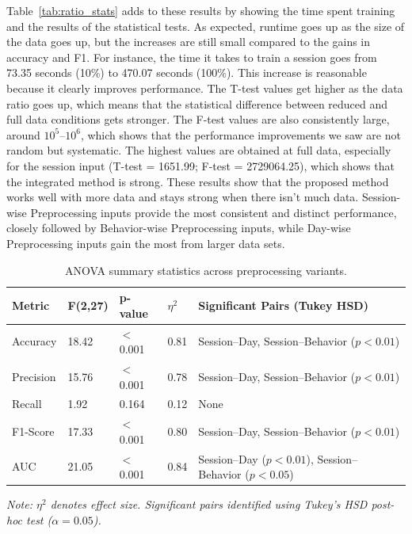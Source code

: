 Table~\ref{tab:ratio_stats} adds to these results by showing the time spent training and the results of the statistical tests. As expected, runtime goes up as the size of the data goes up, but the increases are still small compared to the gains in accuracy and F1. For instance, the time it takes to train a session goes from 73.35 seconds (10\%) to 470.07 seconds (100\%). This increase is reasonable because it clearly improves performance. The T-test values get higher as the data ratio goes up, which means that the statistical difference between reduced and full data conditions gets stronger. The F-test values are also consistently large, around $10^{5}$–$10^{6}$, which shows that the performance improvements we saw are not random but systematic. The highest values are obtained at full data, especially for the session input (T-test = 1651.99; F-test = 2729064.25), which shows that the integrated method is strong. These results show that the proposed method works well with more data and stays strong when there isn't much data. Session-wise Preprocessing inputs provide the most consistent and distinct performance, closely followed by Behavior-wise Preprocessing inputs, while Day-wise Preprocessing inputs gain the most from larger data sets.

\begin{table}[!ht]
\centering
\caption{ANOVA summary statistics across preprocessing variants.}
\label{tab:anova_summary}
\renewcommand{\arraystretch}{1.3}
\small
\begin{tabular}{|l|l|l|l|l|}
\hline
\textbf{Metric} & \textbf{F(2,27)} & \textbf{p-value} & \textbf{$\eta^2$} & \textbf{Significant Pairs (Tukey HSD)} \\ \hline
Accuracy & 18.42 & $<$0.001 & 0.81 & Session–Day, Session–Behavior ($p<0.01$) \\ \hline
Precision & 15.76 & $<$0.001 & 0.78 & Session–Day, Session–Behavior ($p<0.01$) \\ \hline
Recall & 1.92 & 0.164 & 0.12 & None \\ \hline
F1-Score & 17.33 & $<$0.001 & 0.80 & Session–Day, Session–Behavior ($p<0.01$) \\ \hline
AUC & 21.05 & $<$0.001 & 0.84 & Session–Day ($p<0.01$), Session–Behavior ($p<0.05$) \\ \hline
\end{tabular}

\vspace{1mm}
\scriptsize{\textit{Note: $\eta^2$ denotes effect size. Significant pairs identified using Tukey’s HSD post-hoc test ($\alpha = 0.05$).}}
\end{table}



